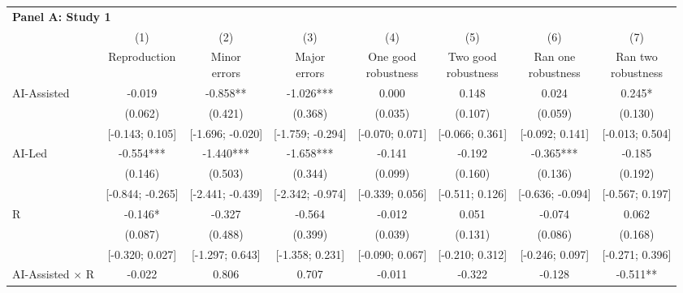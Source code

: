 \def\sym#1{\ifmmode^{#1}\else\(^{#1}\)\fi}
\begin{tabular}{l*{7}{c}}
\hline\hline
\multicolumn{8}{l}{\textbf{Panel A: Study 1}}\\
& (1) & (2) & (3) & (4) & (5) & (6) & (7)\\
                    &Reproduction   &\shortstack[c]{Minor\\errors}   &\shortstack[c]{Major\\errors}   &\shortstack[c]{One good\\robustness}   &\shortstack[c]{Two good\\robustness}   &\shortstack[c]{Ran one\\robustness}   &\shortstack[c]{Ran two\\robustness}   \\
\hline
AI-Assisted         &      -0.019   &      -0.858** &      -1.026***&       0.000   &       0.148   &       0.024   &       0.245*  \\
                    &     (0.062)   &     (0.421)   &     (0.368)   &     (0.035)   &     (0.107)   &     (0.059)   &     (0.130)   \\
                    &[-0.143; 0.105]   &[-1.696; -0.020]   &[-1.759; -0.294]   &[-0.070; 0.071]   &[-0.066; 0.361]   &[-0.092; 0.141]   &[-0.013; 0.504]   \\
AI-Led              &      -0.554***&      -1.440***&      -1.658***&      -0.141   &      -0.192   &      -0.365***&      -0.185   \\
                    &     (0.146)   &     (0.503)   &     (0.344)   &     (0.099)   &     (0.160)   &     (0.136)   &     (0.192)   \\
                    &[-0.844; -0.265]   &[-2.441; -0.439]   &[-2.342; -0.974]   &[-0.339; 0.056]   &[-0.511; 0.126]   &[-0.636; -0.094]   &[-0.567; 0.197]   \\
R                   &      -0.146*  &      -0.327   &      -0.564   &      -0.012   &       0.051   &      -0.074   &       0.062   \\
                    &     (0.087)   &     (0.488)   &     (0.399)   &     (0.039)   &     (0.131)   &     (0.086)   &     (0.168)   \\
                    &[-0.320; 0.027]   &[-1.297; 0.643]   &[-1.358; 0.231]   &[-0.090; 0.067]   &[-0.210; 0.312]   &[-0.246; 0.097]   &[-0.271; 0.396]   \\
AI-Assisted $\times$ R&      -0.022   &       0.806   &       0.707   &      -0.011   &      -0.322   &      -0.128   &      -0.511** \\

\end{tabular}
